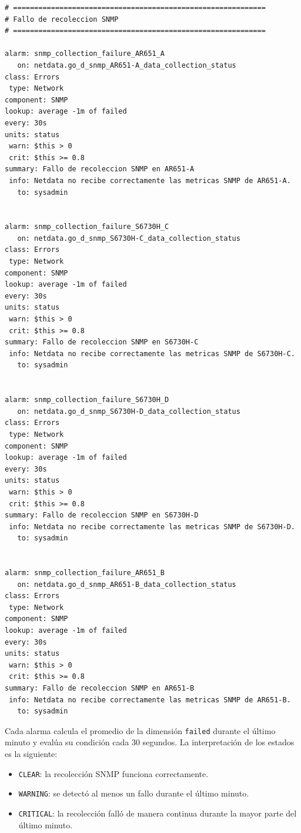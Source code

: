 \begin{lstlisting}[style=terminal]
# ============================================================
# Fallo de recoleccion SNMP
# ============================================================

alarm: snmp_collection_failure_AR651_A
   on: netdata.go_d_snmp_AR651-A_data_collection_status
class: Errors
 type: Network
component: SNMP
lookup: average -1m of failed
every: 30s
units: status
 warn: $this > 0
 crit: $this >= 0.8
summary: Fallo de recoleccion SNMP en AR651-A
 info: Netdata no recibe correctamente las metricas SNMP de AR651-A.
   to: sysadmin


alarm: snmp_collection_failure_S6730H_C
   on: netdata.go_d_snmp_S6730H-C_data_collection_status
class: Errors
 type: Network
component: SNMP
lookup: average -1m of failed
every: 30s
units: status
 warn: $this > 0
 crit: $this >= 0.8
summary: Fallo de recoleccion SNMP en S6730H-C
 info: Netdata no recibe correctamente las metricas SNMP de S6730H-C.
   to: sysadmin


alarm: snmp_collection_failure_S6730H_D
   on: netdata.go_d_snmp_S6730H-D_data_collection_status
class: Errors
 type: Network
component: SNMP
lookup: average -1m of failed
every: 30s
units: status
 warn: $this > 0
 crit: $this >= 0.8
summary: Fallo de recoleccion SNMP en S6730H-D
 info: Netdata no recibe correctamente las metricas SNMP de S6730H-D.
   to: sysadmin


alarm: snmp_collection_failure_AR651_B
   on: netdata.go_d_snmp_AR651-B_data_collection_status
class: Errors
 type: Network
component: SNMP
lookup: average -1m of failed
every: 30s
units: status
 warn: $this > 0
 crit: $this >= 0.8
summary: Fallo de recoleccion SNMP en AR651-B
 info: Netdata no recibe correctamente las metricas SNMP de AR651-B.
   to: sysadmin
\end{lstlisting}

Cada alarma calcula el promedio de la dimensión \texttt{failed} durante el último minuto y evalúa su condición cada 30 segundos. La interpretación de los estados es la siguiente:

\begin{itemize}
    \item \texttt{CLEAR}: la recolección SNMP funciona correctamente.
    \item \texttt{WARNING}: se detectó al menos un fallo durante el último minuto.
    \item \texttt{CRITICAL}: la recolección falló de manera continua durante la mayor parte del último minuto.
\end{itemize}

